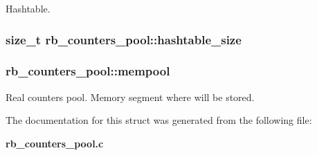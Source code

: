 Hashtable. 

\subsubsection[{hashtable\+\_\+size}]{\setlength{\rightskip}{0pt plus 5cm}size\+\_\+t rb\+\_\+counters\+\_\+pool\+::hashtable\+\_\+size}\label{structrb__counters__pool_a1516ccdced571000d2faf01ff537ddf3}
\subsubsection[{mempool}]{ rb\+\_\+counters\+\_\+pool\+::mempool}\label{structrb__counters__pool_ad42bea24eec7e2c7ea42865b0777f5ca}


Real counters pool. Memory segment where will be stored. 



The documentation for this struct was generated from the following file\+:\begin{DoxyCompactItemize}
\item 
{\bf rb\+\_\+counters\+\_\+pool.\+c}\end{DoxyCompactItemize}
